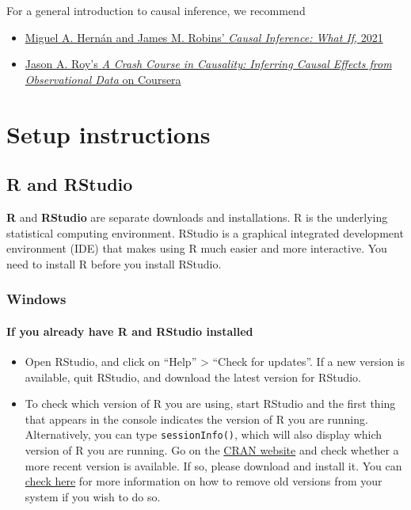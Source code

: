 \documentclass[12pt, krantz2,]{krantz}
\newcommand{\passthrough}[1]{#1}
\providecommand{\tightlist}{%
  \setlength{\itemsep}{0pt}\setlength{\parskip}{0pt}}
\let\oldparagraph\paragraph
\renewcommand{\paragraph}[1]{\oldparagraph{#1}\mbox{}}
\theoremstyle{definition}
\theoremstyle{definition}
\theoremstyle{definition}
\newcommand{\1}{\mathbbm{1}}
\begin{document}
For a general introduction to causal inference, we recommend

\begin{itemize}
\tightlist
\item
  \href{https://www.hsph.harvard.edu/miguel-hernan/causal-inference-book/}{Miguel A. Hernán and James M. Robins' \emph{Causal Inference: What If},
  2021}
\item
  \href{https://www.coursera.org/learn/crash-course-in-causality}{Jason A. Roy's \emph{A Crash Course in Causality: Inferring Causal Effects from
  Observational Data} on
  Coursera}
\end{itemize}

\hypertarget{setup}{%
\section{Setup instructions}\label{setup}}

\hypertarget{r-and-rstudio}{%
\subsection{R and RStudio}\label{r-and-rstudio}}

\textbf{R} and \textbf{RStudio} are separate downloads and installations. R is the
underlying statistical computing environment. RStudio is a graphical integrated
development environment (IDE) that makes using R much easier and more
interactive. You need to install R before you install RStudio.

\hypertarget{windows}{%
\subsubsection{Windows}\label{windows}}

\hypertarget{if-you-already-have-r-and-rstudio-installed}{%
\paragraph{If you already have R and RStudio installed}\label{if-you-already-have-r-and-rstudio-installed}}

\begin{itemize}
\tightlist
\item
  Open RStudio, and click on ``Help'' \textgreater{} ``Check for updates''. If a new version is
  available, quit RStudio, and download the latest version for RStudio.
\item
  To check which version of R you are using, start RStudio and the first thing
  that appears in the console indicates the version of R you are
  running. Alternatively, you can type \passthrough{\lstinline!sessionInfo()!}, which will also display
  which version of R you are running. Go on the \href{https://cran.r-project.org/bin/windows/base/}{CRAN
  website} and check whether a
  more recent version is available. If so, please download and install it. You
  can \href{https://cran.r-project.org/bin/windows/base/rw-FAQ.html\#How-do-I-UNinstall-R_003f}{check here}
  for more information on how to remove old versions from your system if you
  wish to do so.
\end{itemize}
\end{document}
